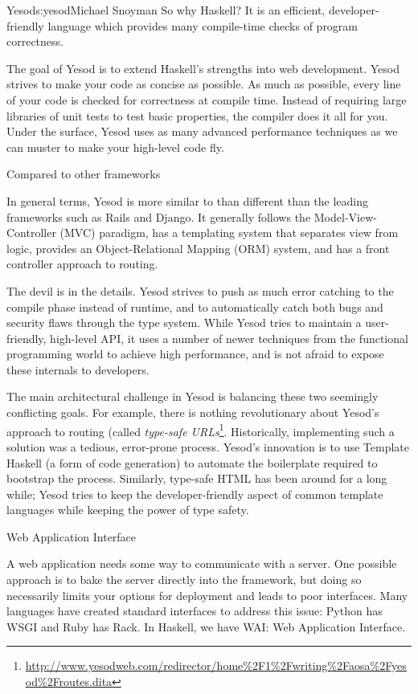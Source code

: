 \begin{aosachapter}{Yesod}{s:yesod}{Michael Snoyman}
So why Haskell? It is an efficient, developer-friendly language which
provides many compile-time checks of program correctness.

The goal of Yesod is to extend Haskell's strengths into web
development. Yesod strives to make your code as concise as
possible. As much as possible, every line of your code is checked for
correctness at compile time. Instead of requiring large libraries of
unit tests to test basic properties, the compiler does it all for
you. Under the surface, Yesod uses as many advanced performance
techniques as we can muster to make your high-level code fly.

\begin{aosasect1}{Compared to other frameworks}

In general terms, Yesod is more similar to than different than 
the leading frameworks such as Rails and Django. It generally
follows the Model-View-Controller (MVC) paradigm, has a templating
system that separates view from logic, provides an Object-Relational
Mapping (ORM) system, and has a front controller approach to routing.

The devil is in the details. Yesod strives to push as much error
catching to the compile phase instead of runtime, and to automatically
catch both bugs and security flaws through the type system. While
Yesod tries to maintain a user-friendly, high-level API, it uses a
number of newer techniques from the functional programming world to
achieve high performance, and is not afraid to expose these internals
to developers.

The main architectural challenge in Yesod is balancing these two
seemingly conflicting goals. For example, there is nothing
revolutionary about Yesod's approach to routing (called
\emph{type-safe URLs}\footnote{\url{http://www.yesodweb.com/redirector/home\%2F1\%2Fwriting\%2Faosa\%2Fyesod\%2Froutes.dita}}.
Historically, implementing such a solution was a tedious, error-prone
process. Yesod's innovation is to use Template Haskell (a form of code
generation) to automate the boilerplate required to bootstrap the
process. Similarly, type-safe HTML has been around for a long while;
Yesod tries to keep the developer-friendly aspect of common template
languages while keeping the power of type safety.

\end{aosasect1}

\begin{aosasect1}{Web Application Interface}

A web application needs some way to communicate with a server. One
possible approach is to bake the server directly into the framework,
but doing so necessarily limits your options for deployment and leads
to poor interfaces. Many languages have created standard interfaces to
address this issue: Python has WSGI and Ruby has Rack. In Haskell, we
have WAI: Web Application Interface.


\end{aosasect1}
\end{aosachapter}
